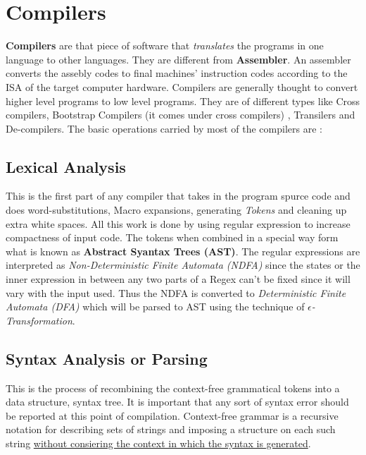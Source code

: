 \chapter{Compilers}
\graphicspath{ {./images/} }


\textbf{Compilers} are that piece of software that \textit{translates} the programs in one language to other languages. They are different from \textbf{Assembler}. An assembler converts the assebly codes to final machines' instruction codes according to the ISA of the target computer hardware. Compilers are generally thought to convert higher level programs to low level programs. They are of different types like Cross compilers, Bootstrap Compilers (it comes under cross compilers)
, Transilers and De-compilers. The basic operations carried by most of the compilers are :\\

\section{Lexical Analysis}
This is the first part of any compiler that takes in the program spurce code and does word-substitutions, Macro expansions, generating \textit{Tokens} and cleaning up extra white spaces. All this work is done by using regular expression to increase compactness of input code. The tokens when combined in a special way form what is known as \textbf{Abstract Syantax Trees (AST)}. The regular expressions are interpreted as \textit{Non-Deterministic Finite Automata (NDFA)} since the states or the inner expression in between any two parts of a Regex can't be fixed since it will vary with the input used. Thus the NDFA is converted to \textit{Deterministic Finite Automata (DFA)} which will be parsed to AST using the technique of \textit{$\epsilon$-Transformation}.\\

\section{Syntax Analysis or Parsing}
This is the process of recombining the context-free grammatical tokens into a data structure, syntax tree. It is important that any sort of syntax error should be reported at this point of compilation. Context-free grammar is a recursive notation for describing sets of strings and imposing a structure on each such string \underline{without consiering the context in which the syntax is generated}.\\ 

